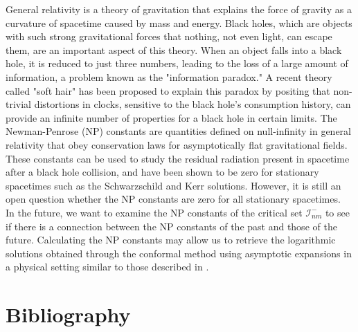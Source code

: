 \documentclass[
11pt, %
english, %
singlespacing, %
headsepline, %
]{MastersDoctoralThesis} %
\begin{document}

General relativity is a theory of gravitation that explains the force of gravity as a curvature of spacetime caused by mass and energy. Black holes, which are objects with such strong gravitational forces that nothing, not even light, can escape them, are an important aspect of this theory. When an object falls into a black hole, it is reduced to just three numbers, leading to the loss of a large amount of information, a problem known as the "information paradox." A recent theory called "soft hair" has been proposed to explain this paradox by positing that non-trivial distortions in clocks, sensitive to the black hole's consumption history, can provide an infinite number of properties for a black hole in certain limits. The Newman-Penrose (NP) constants are quantities defined on null-infinity in general relativity that obey conservation laws for asymptotically flat gravitational fields. These constants can be used to study the residual radiation present in spacetime after a black hole collision, and have been shown to be zero for stationary spacetimes such as the Schwarzschild and Kerr solutions. However, it is still an open question whether the NP constants are zero for all stationary spacetimes.
\\
 In the future, we want to examine the NP constants of the critical set $\mathcal{I}_{nm}^-$
to see if there is a connection between the NP constants of the past
and those of the future. Calculating the NP constants may allow us to
retrieve the logarithmic solutions obtained through the conformal
method using asymptotic expansions in a physical setting similar to
those described in \cite{DuaFenGas22}.

\section{Bibliography}




%
%

\printbibliography[]

%

\end{document}
